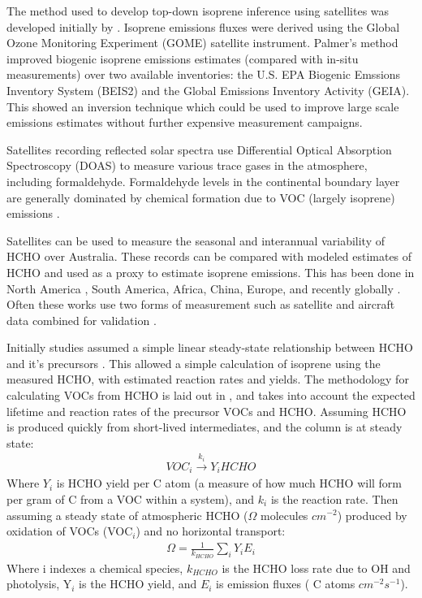     The method used to develop top-down isoprene inference using satellites was developed initially by \citet{Palmer2001,Palmer2003}. 
    Isoprene emissions fluxes were derived using the Global Ozone Monitoring Experiment (GOME) satellite instrument.
    Palmer's method improved biogenic isoprene emissions estimates (compared with in-situ measurements) over two available inventories: the U.S. EPA Biogenic Emssions Inventory System (BEIS2) and the Global Emissions Inventory Activity (GEIA).
    This showed an inversion technique which could be used to improve large scale emissions estimates without further expensive measurement campaigns.
    
    Satellites recording reflected solar spectra use Differential Optical Absorption Spectroscopy (DOAS) to measure various trace gases in the atmosphere, including formaldehyde. 
    Formaldehyde levels in the continental boundary layer are generally dominated by chemical formation due to VOC (largely isoprene) emissions \citep{Kefauver2014}.
    
    Satellites can be used to measure the seasonal and interannual variability of HCHO over Australia.
    These records can be compared with modeled estimates of HCHO and used as a proxy to estimate isoprene emissions.
    This has been done in North America \citep{Palmer2003, Millet2006}, South America, Africa, China, Europe, and recently globally \citep{FortemsCheiney2012, Bauwens2016}.
    Often these works use two forms of measurement such as satellite and aircraft data combined for validation \citep{Marais_2014}.
    
    Initially studies assumed a simple linear steady-state relationship between HCHO and it's precursors \citep{Palmer2003,Palmer2006,Millet2006}.
    This allowed a simple calculation of isoprene using the measured HCHO, with estimated reaction rates and yields.
    The methodology for calculating VOCs from HCHO is laid out in \citet{Palmer2003}, and takes into account the expected lifetime and reaction rates of the precursor VOCs and HCHO.
    Assuming HCHO is produced quickly from short-lived intermediates, and the column is at steady state:
    \begin{eqnarray*}
    VOC_i \overset{k_i}{\rightarrow} Y_i HCHO
    \end{eqnarray*}
    Where $Y_i$ is HCHO yield per C atom (a measure of how much HCHO will form per gram of C from a VOC within a system), and $k_i$ is the reaction rate.
    Then assuming a steady state of atmospheric HCHO ($\Omega$ molecules $cm^{-2}$) produced by oxidation of VOCs (VOC$_i$) and no horizontal transport:
    \begin{eqnarray*}
    \Omega = \frac{1}{k_{HCHO}} \sum_{i} Y_i E_i
    \end{eqnarray*}
    Where i indexes a chemical species, $k_{HCHO}$ is the HCHO loss rate due to OH and photolysis, Y$_i$ is the HCHO yield, and $E_i$ is emission fluxes ( C atoms $cm^{-2}s^{-1}$).
    
